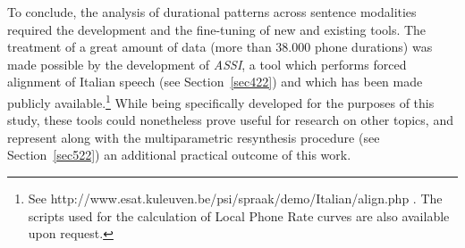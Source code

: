 To conclude, the analysis of durational patterns across sentence modalities required the development and the fine-tuning of new and existing tools. The treatment of a great amount of data (more than 38.000 phone durations) was made possible by the development of \textit{ASSI}, a tool which performs forced alignment of Italian speech (see Section~\ref{sec422}) and which has been made publicly available.\footnote{See http://www.esat.kuleuven.be/psi/spraak/demo/Italian/align.php . The scripts used for the calculation of Local Phone Rate curves are also available upon request.} While being specifically developed for the purposes of this study, these tools could nonetheless prove useful for research on other topics, and represent along with the multiparametric resynthesis procedure (see Section~\ref{sec522}) an additional practical outcome of this work.